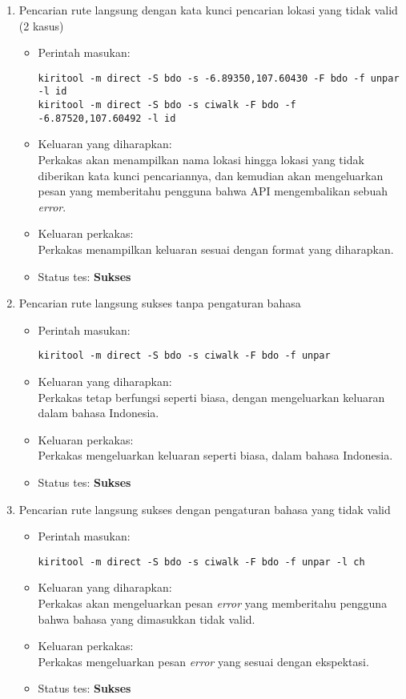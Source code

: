 \begin{enumerate}
	\item Pencarian rute langsung dengan kata kunci pencarian lokasi yang tidak valid (2 kasus)
	\begin{itemize}
		\item Perintah masukan:
		\begin{verbatim}
kiritool -m direct -S bdo -s -6.89350,107.60430 -F bdo -f unpar -l id
kiritool -m direct -S bdo -s ciwalk -F bdo -f -6.87520,107.60492 -l id
		\end{verbatim}
		\item Keluaran yang diharapkan: \\
		Perkakas akan menampilkan nama lokasi hingga lokasi yang tidak diberikan kata kunci pencariannya, dan kemudian akan mengeluarkan pesan yang memberitahu pengguna bahwa API mengembalikan sebuah \textit{error}.
		\item Keluaran perkakas: \\
		Perkakas menampilkan keluaran sesuai dengan format yang diharapkan.
		\item Status tes: \textbf{Sukses}
	\end{itemize}
	
	\item Pencarian rute langsung sukses tanpa pengaturan bahasa
	\begin{itemize}
		\item Perintah masukan:
		\begin{verbatim}
kiritool -m direct -S bdo -s ciwalk -F bdo -f unpar
		\end{verbatim}
		\item Keluaran yang diharapkan: \\
		Perkakas tetap berfungsi seperti biasa, dengan mengeluarkan keluaran dalam bahasa Indonesia.
		\item Keluaran perkakas: \\
		Perkakas mengeluarkan keluaran seperti biasa, dalam bahasa Indonesia.
		\item Status tes: \textbf{Sukses}
	\end{itemize}
	
	\item Pencarian rute langsung sukses dengan pengaturan bahasa yang tidak valid
	\begin{itemize}
		\item Perintah masukan:
		\begin{verbatim}
kiritool -m direct -S bdo -s ciwalk -F bdo -f unpar -l ch
		\end{verbatim}
		\item Keluaran yang diharapkan: \\
		Perkakas akan mengeluarkan pesan \textit{error} yang memberitahu pengguna bahwa bahasa yang dimasukkan tidak valid.
		\item Keluaran perkakas: \\
		Perkakas mengeluarkan pesan \textit{error} yang sesuai dengan ekspektasi.
		\item Status tes: \textbf{Sukses}
	\end{itemize}
	
\end{enumerate}
